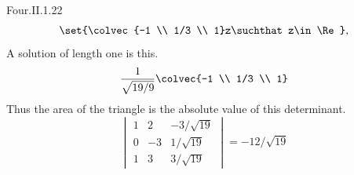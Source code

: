 \begin{ans}{Four.II.1.22}
\begin{equation*}
        \set{\colvec{-1 \\ 1/3 \\ 1}z\suchthat z\in\Re},
      \end{equation*}
      A solution of length one is this.
      \begin{equation*}
        \frac{1}{\sqrt{19/9}}\colvec{-1 \\ 1/3 \\ 1}
      \end{equation*}
      Thus the area of the triangle is the absolute value of
      this determinant.
      \begin{equation*}
        \begin{vmatrix}
             1  &2   &-3/\sqrt{19}   \\
             0  &-3  &1/\sqrt{19}   \\
             1  &3   &3/\sqrt{19}
        \end{vmatrix}
        =-12/\sqrt{19}
      \end{equation*}
    
\end{ans}
